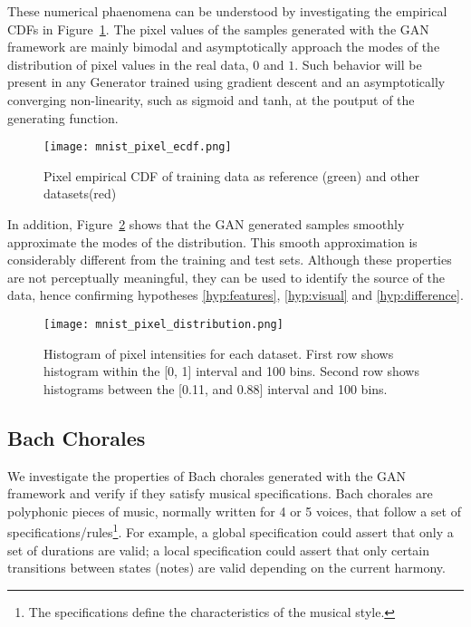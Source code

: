 These numerical phaenomena can be understood by investigating the empirical CDFs 
in Figure~\ref{fig:mnist_pixel_ecdf}. The pixel values of the samples
generated with the GAN framework are mainly bimodal and asymptotically
approach the modes of the distribution of pixel values in the real data, $0$ and $1$. Such behavior will be
present in any Generator trained using gradient descent and an asymptotically converging 
non-linearity, such as sigmoid and tanh, at the poutput of the generating function.

\begin{figure}[!h]
  \texttt{[image: mnist\_pixel\_ecdf.png]}
    \caption{Pixel empirical CDF of training data as reference (green) and other
    datasets(red)}
  \label{fig:mnist_pixel_ecdf}
\end{figure}

In addition, Figure~\ref{fig:mnist_pixel_distribution} shows that the GAN
generated samples smoothly approximate the modes of the distribution. This
smooth approximation is considerably different from the training and test sets.
Although these properties are not perceptually meaningful, they can be used to 
identify the source of the data, hence confirming hypotheses \ref{hyp:features}, 
\ref{hyp:visual} and \ref{hyp:difference}.

\begin{figure}[!h]
  \texttt{[image: mnist\_pixel\_distribution.png]}
  \caption{Histogram of pixel intensities for each dataset. First row shows
    histogram within the [0, 1] interval and 100 bins. Second row shows
    histograms between the [0.11, and 0.88] interval and 100 bins.}
  \label{fig:mnist_pixel_distribution}
\end{figure}

\subsection{Bach Chorales}
We investigate the properties of Bach chorales generated with the GAN framework
and verify if they satisfy musical specifications.
Bach chorales are polyphonic pieces of music, normally
written for 4 or 5 voices, that follow a set of
specifications/rules\footnote{The specifications define the characteristics of the 
musical style.}. For example, a global specification could assert that only a set of
durations are valid; a local specification could assert that only certain
transitions between states (notes) are valid depending on the current harmony.

